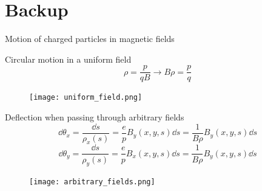 \documentclass[aspectratio=169]{beamer}
\begin{document}
\section*{Backup}
\begin{frame}{Motion of charged particles in magnetic fields}
    \begin{minipage}{\textwidth}
        \begin{minipage}{0.6\textwidth}
            Circular motion in a uniform field
            \begin{equation*}
                \rho =  \frac{p}{qB}\to B\rho = \frac{p}{q}
            \end{equation*}
        \end{minipage}
        \hfill
        \begin{minipage}{0.39\textwidth}
            \begin{figure}
                \centering
                \texttt{[image: uniform\_field.png]}
            \end{figure}
        \end{minipage}
    \end{minipage}
    \vfill
    \pause
    \begin{minipage}{\textwidth}
        \begin{minipage}{0.6\textwidth}
            Deflection when passing through arbitrary fields
            \begin{equation*}
                \dd{\theta_x} = \frac{\dd{s}}{\rho_x(s)} = \frac{e}{p}B_y(x,y,s)\dd s = \frac{1}{B\rho}B_y(x,y,s)\dd s
            \end{equation*}
            \begin{equation*}
                \dd{\theta_y} = \frac{\dd{s}}{\rho_y(s)} = \frac{e}{p}B_x(x,y,s)\dd s = \frac{1}{B\rho}B_y(x,y,s)\dd s
            \end{equation*}
        \end{minipage}
        \begin{minipage}{0.39\textwidth}
            \begin{figure}
                \centering
                \texttt{[image: arbitrary\_fields.png]}
            \end{figure}
        \end{minipage}
    \end{minipage}
\end{frame}
\end{document}
